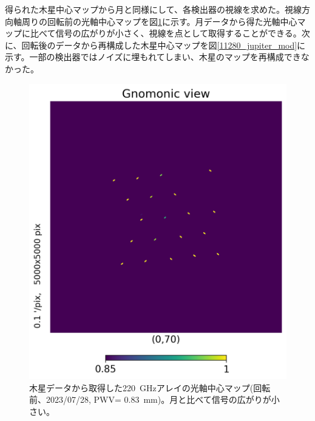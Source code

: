 得られた木星中心マップから月と同様にして、各検出器の視線を求めた。視線方向軸周りの回転前の光軸中心マップを図\ref{5987_gnomonic}に示す。月データから得た光軸中心マップに比べて信号の広がりが小さく、視線を点として取得することができる。次に、回転後のデータから再構成した木星中心マップを図\ref{11280_jupiter_mod}に示す。一部の検出器ではノイズに埋もれてしまい、木星のマップを再構成できなかった。
\begin{figure}[htbp]
  \centering
  \includegraphics[width=0.6\columnwidth]{5_alignment/figs/5987_gnomonic.png}
  \caption{木星データから取得した\SI{220}{GHz}アレイの光軸中心マップ(回転前、2023/07/28, PWV= \SI{0.83}{mm})。月と比べて信号の広がりが小さい。}
  \label{5987_gnomonic}
\end{figure}
